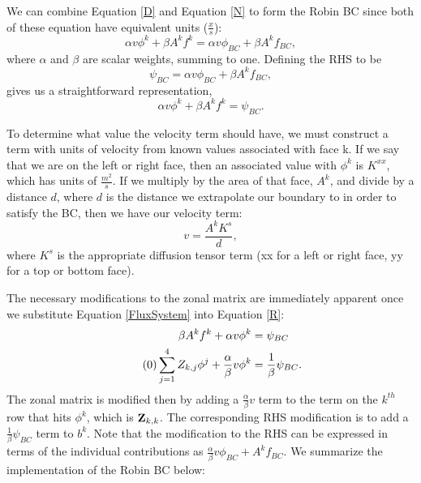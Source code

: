 \documentclass[11pt,letterpaper,oneside,notitlepage]{article}	%
\newcommand{\yestag}{\tag{\theequation}\stepcounter{equation}}	%
\newcommand{\eq}[1]{Equation \eqref{#1}}		%
\begin{document}
We can combine \eq{D} and \eq{N} to form the Robin BC since both of these equation have equivalent units ($\frac{x}{s}$):
\begin{equation}
\alpha v \phi^k + \beta A^k f^k = \alpha v \phi_{BC} + \beta A^k f_{BC} \label{RobinFull}
,\end{equation}
where $\alpha$ and $\beta$ are scalar weights, summing to one. Defining the RHS to be 
\begin{equation}
\psi_{BC} =  \alpha v \phi_{BC} + \beta A^k f_{BC}
,\end{equation}
gives us a straightforward representation,
\begin{equation}
\alpha v \phi^k + \beta A^k f^k = \psi_{BC} \label{R}
.\end{equation}

To determine what value the velocity term should have, we must construct a term with units of velocity from known values associated with face k. If we say that we are on the left or right face, then an associated value with $\phi^k$ is $K^{xx}$, which has units of $\frac{m^2}{s}$. If we multiply by the area of that face, $A^k$, and divide by a distance $d$, where $d$ is the distance we extrapolate our boundary to in order to satisfy the BC, then we have our velocity term:
\begin{equation} 
v=\frac{A^k K^{s}}{d},
\end{equation}
where $K^s$ is the appropriate diffusion tensor term (xx for a left or right face, yy for a top or bottom face).

The necessary modifications to the zonal matrix are immediately apparent once we substitute \eq{FluxSystem} into \eq{R}:
\begin{align*}
\beta A^k f^k +\alpha v \phi^k  &= \psi_{BC} \\ \yestag
 \sum_{j=1}^4 Z_{k,j} \phi^j + \frac{\alpha}{\beta} v \phi^k  &= \frac{1}{\beta}\psi_{BC} 
.\end{align*}
The zonal matrix is modified then by adding a $\frac{\alpha}{\beta} v$ term to the term on the $k^{th}$ row that hits $\phi^k$, which is ${\bf Z}_{k,k}$. The corresponding RHS modification is to add a $\frac{1}{\beta}\psi_{BC}$ term to $b^k$. Note that the modification to the RHS can be expressed in terms of the individual contributions as $\frac{\alpha}{\beta} v \phi_{BC} + A^k f_{BC}$. We summarize the implementation of the Robin BC below:
\end{document}
